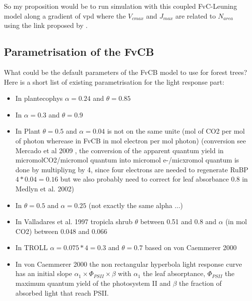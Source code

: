\documentclass[a4paper,11pt]{article}
\begin{document}
So my proposition would be to run simulation with this coupled FvC-Leuning model along a gradient of vpd where the $V_{cmax}$ and $J_{max}$ are related to $N_{area}$ using the link proposed by \citep{Sakschewski-2015}.

\subsection{Parametrisation of the FvCB}


What could be the default parameters of the FvCB model to use for
forest trees? Here is a short list of existing parametrisation for the
light response part:
\begin{itemize}

\item In plantecophys \citep{Duursma-2015}  $\alpha = 0.24$ and $\theta = 0.85$

\item In \citet{Medlyn-2002} $\alpha = 0.3$ and $\theta = 0.9$

\item In Plant $\theta = 0.5$ and $\alpha= 0.04$ is not on the same unite (mol of CO2 per mol of photon wherease in FvCB in mol electron per mol photon)  (conversion see Mercado et al 2009 , the conversion of the apparent quantum yield in micromolCO2/micromol quantum into micromol e-/micxromol quantum is done by multipliyng by 4, since four electrons are needed to regenerate RuBP $4*0.04 = 0.16$ but we also probably need to correct for leaf absorbance 0.8 in Medlyn et al. 2002)

\item In \citet{Sterck-2011} $\theta = 0.5$ and $\alpha = 0.25$ (not exactly the same alpha ...)

\item  In Valladares et al. 1997 tropicla shrub $\theta$ between 0.51 and 0.8 and $\alpha$ (in mol CO2) between 0.048 and 0.066

\item In TROLL \citet{Marechaux-2017} $\alpha = 0.075*4 = 0.3$ and $\theta = 0.7$ based on von Caemmerer 2000

\item In von Caemmerer 2000 the non rectangular hyperbola light response curve has an initial slope $\alpha_1 \times \Phi_{PSII} \times \beta$ with $\alpha_1$ the leaf absorptance, $\Phi_{PSII}$ the maximum quantum yield of the photosystem II and $\beta$ the fraction of absorbed light that reach PSII.

\end{itemize}
\end{document}
